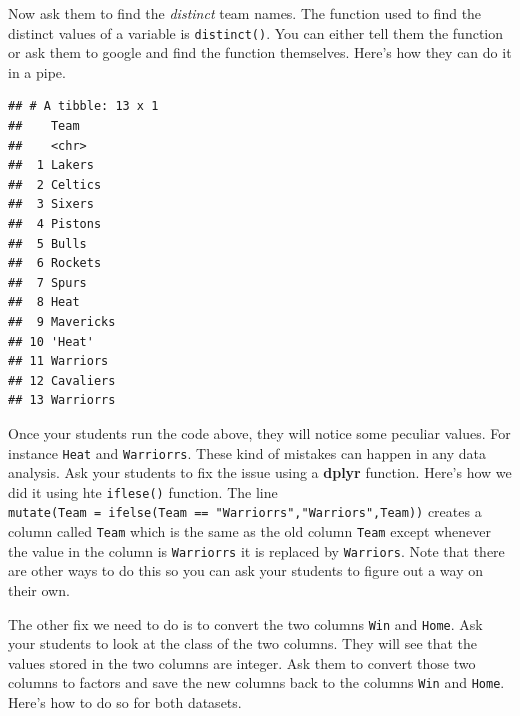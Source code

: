 \documentclass[]{book}
\newenvironment{Shaded}{\begin{snugshade}}{\end{snugshade}}
\newcommand{\CommentTok}[1]{\textcolor[rgb]{0.56,0.35,0.01}{\textit{#1}}}
\newcommand{\KeywordTok}[1]{\textcolor[rgb]{0.13,0.29,0.53}{\textbf{#1}}}
\newcommand{\NormalTok}[1]{#1}
\newcommand{\OperatorTok}[1]{\textcolor[rgb]{0.81,0.36,0.00}{\textbf{#1}}}
\newcommand{\StringTok}[1]{\textcolor[rgb]{0.31,0.60,0.02}{#1}}
\begin{document}
Now ask them to find the \emph{distinct} team names. The function used to find the distinct values of a variable is \texttt{distinct()}. You can either tell them the function or ask them to google and find the function themselves. Here's how they can do it in a pipe.

\begin{Shaded}
\end{Shaded}

\begin{verbatim}
## # A tibble: 13 x 1
##    Team     
##    <chr>    
##  1 Lakers   
##  2 Celtics  
##  3 Sixers   
##  4 Pistons  
##  5 Bulls    
##  6 Rockets  
##  7 Spurs    
##  8 Heat     
##  9 Mavericks
## 10 'Heat'   
## 11 Warriors 
## 12 Cavaliers
## 13 Warriorrs
\end{verbatim}

Once your students run the code above, they will notice some peculiar values. For instance \texttt{\textquotesingle{}Heat\textquotesingle{}} and \texttt{Warriorrs}. These kind of mistakes can happen in any data analysis. Ask your students to fix the issue using a \textbf{dplyr} function. Here's how we did it using hte \texttt{iflese()} function. The line \texttt{mutate(Team\ =\ ifelse(Team\ ==\ "Warriorrs","Warriors",Team))} creates a column called \texttt{Team} which is the same as the old column \texttt{Team} except whenever the value in the column is \texttt{Warriorrs} it is replaced by \texttt{Warriors}. Note that there are other ways to do this so you can ask your students to figure out a way on their own.

The other fix we need to do is to convert the two columns \texttt{Win} and \texttt{Home}. Ask your students to look at the class of the two columns. They will see that the values stored in the two columns are integer. Ask them to convert those two columns to factors and save the new columns back to the columns \texttt{Win} and \texttt{Home}. Here's how to do so for both datasets.
\end{document}
